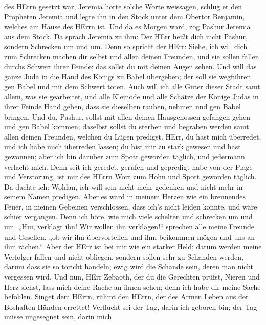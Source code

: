 des HErrn gesetzt war, Jeremia hörte solche Worte weissagen,
 schlug er den Propheten Jeremia und legte ihn in den Stock
unter dem Obertor Benjamin, welches am Hause des HErrn ist. 
Und da es Morgen ward, zog Pashur Jeremia aus dem Stock. Da sprach
Jeremia zu ihm: Der HErr heißt dich nicht Pashur, sondern Schrecken um
und um.  Denn so spricht der HErr: Siehe, ich will dich zum
Schrecken machen dir selbst und allen deinen Freunden, und sie sollen
fallen durchs Schwert ihrer Feinde; das sollst du mit deinen Augen
sehen. Und will das ganze Juda in die Hand des Königs zu Babel
übergeben; der soll sie wegführen gen Babel und mit dem Schwert töten.
 Auch will ich alle Güter dieser Stadt samt allem, was sie
gearbeitet, und alle Kleinode und alle Schätze der Könige Judas in ihrer
Feinde Hand geben, dass sie dieselben rauben, nehmen und gen Babel
bringen.  Und du, Pashur, sollst mit allen deinen
Hausgenossen gefangen gehen und gen Babel kommen; daselbst sollst du
sterben und begraben werden samt allen deinen Freunden, welchen du Lügen
predigst.  HErr, du hast mich überredet, und ich habe mich
überreden lassen; du bist mir zu stark gewesen und hast gewonnen; aber
ich bin darüber zum Spott geworden täglich, und jedermann verlacht mich.
 Denn seit ich geredet, gerufen und gepredigt habe von der
Plage und Verstörung, ist mir des HErrn Wort zum Hohn und Spott geworden
täglich.  Da dachte ich: Wohlan, ich will sein nicht mehr
gedenken und nicht mehr in seinem Namen predigen. Aber es ward in meinem
Herzen wie ein brennendes Feuer, in meinen Gebeinen verschlossen, dass
ich's nicht leiden konnte, und wäre schier vergangen.  Denn
ich höre, wie mich viele schelten und schrecken um und um. „Hui,
verklagt ihn! Wir wollen ihn verklagen!{}`` sprechen alle meine Freunde
und Gesellen, „ob wir ihn übervorteilen und ihm beikommen mögen und uns
an ihm rächen.``  Aber der HErr ist bei mir wie ein starker
Held; darum werden meine Verfolger fallen und nicht obliegen, sondern
sollen sehr zu Schanden werden, darum dass sie so töricht handeln; ewig
wird die Schande sein, deren man nicht vergessen wird.  Und
nun, HErr Zebaoth, der du die Gerechten prüfst, Nieren und Herz siehst,
lass mich deine Rache an ihnen sehen; denn ich habe dir meine Sache
befohlen.  Singet dem HErrn, rühmt den HErrn, der des Armen
Leben aus der Boshaften Händen errettet!  Verflucht sei der
Tag, darin ich geboren bin; der Tag müsse ungesegnet sein, darin mich
